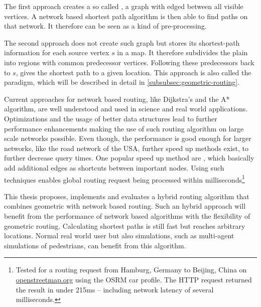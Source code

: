 The first approach creates a so called , a graph with edged between all visible vertices.
A network based shortest path algorithm is then able to find paths on that network\cite[2]{hershberger-suri}.
It therefore can be seen as a kind of pre-processing.

The second approach does not create such graph but stores its shortest-path information for each source vertex $s$ in a map.
It therefore subdivides the plain into regions with common predecessor vertices.
Following these predecessors back to $s$, gives the shortest path to a given location.
This approach is also called the  paradigm, which will be described in detail in \cref{subsubsec:geometric-routing}.

Current approaches for network based routing, like Dijkstra's and the A* algorithm, are well understood and used in science and real world applications.
Optimizations and the usage of better data structures lead to further performance enhancements making the use of such routing algorithm on large scale networks possible.
Even though, the performance is good enough for larger networks, like the road network of the USA\cite[5]{aviram-optimizing-dijkstra}, further speed up methods exist, to further decrease query times.
One popular speed up method are , which basically add additional edges as shortcuts between important nodes\cite{geisberger-contraction-hierarchies}.
Using such techniques enables global routing request being processed within milliseconds\footnote{Tested for a routing request from Hamburg, Germany to Beijing, China on \href{https://www.openstreetmap.org/directions?engine=fossgis\_osrm\_car&route=53.55\%2C10.00\%3B39.91\%2C116.39}{openstreetmap.org} using the OSRM car profile. The HTTP request returned the result in under 215ms -- including network latency of several milliseconds.}

This thesis proposes, implements and evaluates a hybrid routing algorithm that combines geometric with network based routing.
Such an hybrid approach will benefit from the performance of network based algorithms with the flexibility of geometric routing.
Calculating shortest paths is still fast but reaches arbitrary locations.
Normal real world user but also simulations, such as multi-agent simulations of pedestrians, can benefit from this algorithm.